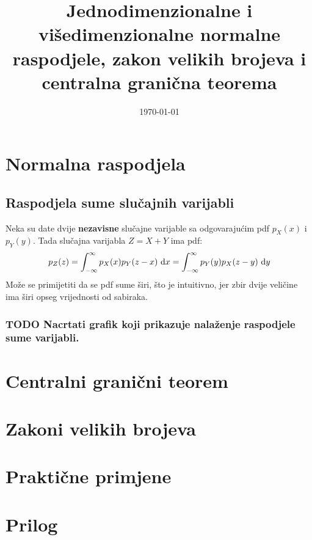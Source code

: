 \documentclass[11pt]{article}
\date{\today}
\title{Jednodimenzionalne i višedimenzionalne normalne raspodjele, zakon velikih
brojeva i centralna granična teorema}
\begin{document}
\maketitle
\tableofcontents

\section{Normalna raspodjela}


\subsection{Raspodjela sume slučajnih varijabli}

Neka su date dvije \textbf{nezavisne} slučajne varijable sa odgovarajućim pdf $p_X(x)$ i
$p_Y(y)$. Tada slučajna varijabla $Z = X + Y$ ima pdf:
$$p_Z(z) = \int_{-\infty}^{\infty} p_X(x) p_Y(z-x) \ \text dx
					 = \int_{-\infty}^{\infty} p_Y(y) p_X(z-y) \ \text dy$$
Može se primijetiti da se pdf sume širi, što je intuitivno, jer zbir dvije
veličine ima širi opseg vrijednosti od sabiraka.

\subsubsection{{\bfseries\sffamily TODO} Nacrtati grafik koji prikazuje nalaženje raspodjele sume varijabli.}

\section{Centralni granični teorem}


\section{Zakoni velikih brojeva}


\section{Praktične primjene}

\section{Prilog}

\end{document}
